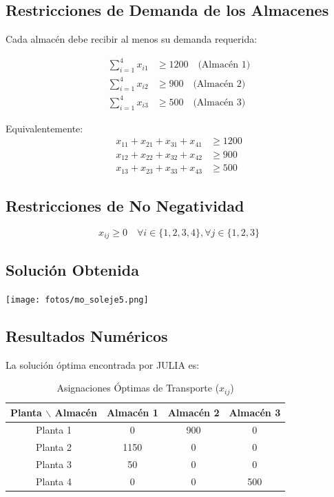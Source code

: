 \documentclass[12pt, a4paper, oneside]{book}
\theoremstyle{definition}
\begin{document}
    \subsection{Restricciones de Demanda de los Almacenes}
    Cada almacén debe recibir al menos su demanda requerida:

    \begin{align}
    \sum_{i=1}^{4} x_{i1} &\geq 1200 \quad \text{(Almacén 1)} \\
    \sum_{i=1}^{4} x_{i2} &\geq 900 \quad \text{(Almacén 2)} \\
    \sum_{i=1}^{4} x_{i3} &\geq 500 \quad \text{(Almacén 3)}
    \end{align}

    Equivalentemente:
    \begin{align}
    x_{11} + x_{21} + x_{31} + x_{41} &\geq 1200 \\
    x_{12} + x_{22} + x_{32} + x_{42} &\geq 900 \\
    x_{13} + x_{23} + x_{33} + x_{43} &\geq 500
    \end{align}

    \subsection{Restricciones de No Negatividad}
    $$x_{ij} \geq 0 \quad \forall i \in \{1,2,3,4\}, \forall j \in \{1,2,3\}$$

    \subsection{Solución Obtenida}

    \begin{center}
    \texttt{[image: fotos/mo\_soleje5.png]}
    \end{center}

    \subsection{Resultados Numéricos}
    La solución óptima encontrada por JULIA es:

    \begin{table}[h]
    \centering
    \caption{Asignaciones Óptimas de Transporte ($x_{ij}$)}
    \begin{tabular}{|c|c|c|c|}
    \hline
    \textbf{Planta $\backslash$ Almacén} & \textbf{Almacén 1} & \textbf{Almacén 2} & \textbf{Almacén 3} \\ \hline
    Planta 1 & 0 & 900 & 0 \\ \hline
    Planta 2 & 1150 & 0 & 0 \\ \hline
    Planta 3 & 50 & 0 & 0 \\ \hline
    Planta 4 & 0 & 0 & 500 \\ \hline
    \end{tabular}
    \end{table}
\end{document}
